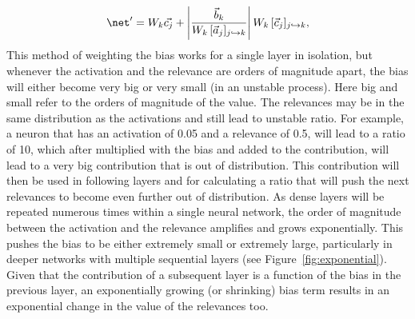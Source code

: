\begin{equation*}
   \net^\prime = W_k \vec{c_j} + \left| \dfrac{\vec{b}_k}{W_k\,[\vec{a}_j]_{j\passto k}}\right| W_k\,[\vec{c}_j]_{j\passto k},
\end{equation*}
\newline
\newline
This method of weighting the bias works for a single layer in isolation, but whenever the activation and the relevance are orders of magnitude apart, the bias will either become very big or very small (in an unstable process). Here big and small refer to the orders of magnitude of the value. The relevances may be in the same distribution as the activations and still lead to unstable ratio. For example, a neuron that has an activation of 0.05 and a relevance of 0.5, will lead to a ratio of 10, which after multiplied with the bias and added to the contribution, will lead to a very big contribution that is out of distribution. This contribution will then be used in following layers and for calculating a ratio that will push the next relevances to become even further out of distribution. As dense layers will be repeated numerous times within a single neural network, the order of magnitude between the activation and the relevance amplifies and grows exponentially. This pushes the bias to be either extremely small or extremely large, particularly in deeper networks with multiple sequential layers (see Figure~\ref{fig:exponential}). Given that the contribution of a subsequent layer is a function of the bias in the previous layer, an exponentially growing (or shrinking) bias term results in an exponential change in the value of the relevances too. 

